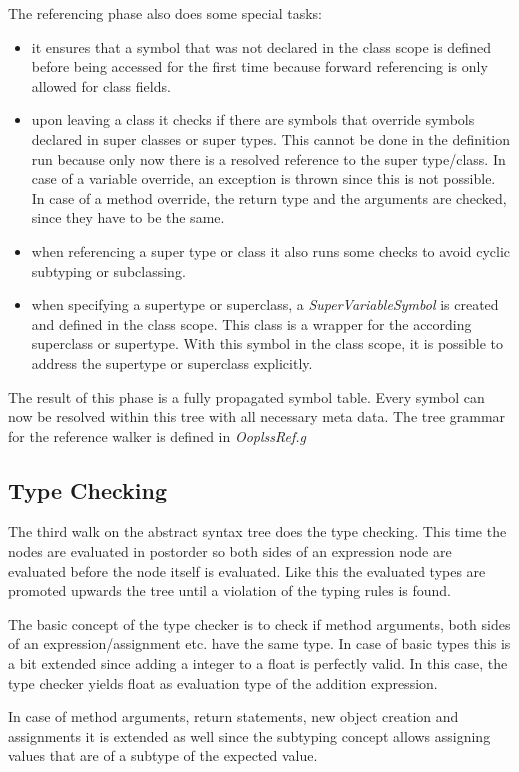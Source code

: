 \noindent The referencing phase also does some special tasks:
\begin{itemize}
\item it ensures that a symbol that was not declared in the class scope is
defined before being accessed for the first time because forward referencing
is only allowed for class fields.
\item upon leaving a class it checks if there are symbols that override symbols
declared in super classes or super types. This cannot be done in the definition 
run because only now there is a resolved reference to the super type/class.
In case of a variable override, an exception is thrown since this is not 
possible. In case of a method override, the return type and the arguments
are checked, since they have to be the same.
\item when referencing a super type or class it also runs some checks to avoid
cyclic subtyping or subclassing.
\item when specifying a supertype or superclass, a \emph{SuperVariableSymbol}
is created and defined in the class scope. This class is a wrapper for the 
according superclass or supertype. With this symbol in the class scope, it
is possible to address the supertype or superclass explicitly.
\end{itemize}

The result of this phase is a fully propagated symbol table. Every symbol can
now be resolved within this tree with all necessary meta data. The tree grammar
for the reference walker is defined in \emph{OoplssRef.g}

\subsection{Type Checking}

The third walk on the abstract syntax tree does the type checking. This
time the nodes are evaluated in postorder so both sides of an expression
node are evaluated before the node itself is evaluated. Like this the
evaluated types are promoted upwards the tree until a violation of the
typing rules is found.

The basic concept of the type checker is to check if method arguments,
both sides of an expression/assignment etc. have the same type. In case
of basic types this is a bit extended since adding a integer to a float
is perfectly valid. In this case, the type checker yields float as 
evaluation type of the addition expression.

In case of method arguments, return statements, new object creation
and assignments it is extended as well since the subtyping concept
allows assigning values that are of a subtype of the expected value.\\

